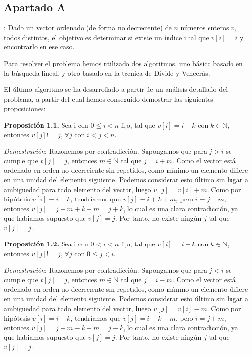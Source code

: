 \usepackage{listings}

\subsection{Apartado A}

: Dado un vector ordenado (de forma no decreciente) de $n$ números enteros $v$, todos 
distintos, el objetivo es determinar si existe un índice i tal que $v[i] = i$ y 
encontrarlo en ese caso. 

Para resolver el problema hemos utilizado dos algoritmos, uno básico basado en 
la búsqueda lineal, y otro basado en la técnica de Divide y Vencerás. 

El último algoritmo se ha desarrollado a partir de un análisis detallado del 
problema, a partir del cual hemos conseguido demostrar las siguientes proposiciones:

\textbf{Proposición 1.1.} Sea i con $0 \leqslant i < n$ fijo, tal que $v[i]=i+k$ con 
$k \in \mathbb N$, entonces $v[j]!=j$, $\forall j$ con $i < j < n$. 

\textit{Demostración}: Razonemos por contradicción. Supongamos que para $j > i$ se 
cumple que $v[j]=j$, entonces \exists $m \in \mathbb N$ tal que $j=i+m$. Como el 
vector está ordenado en orden no decreciente sin repetidos, como mínimo un elemento
difiere en una unidad del elemento siguiente. Podemos considerar esto último sin 
lugar a ambiguedad para todo elemento del vector, luego $v[j]=v[i]+m$. Como por hipótesis
$v[i]=i+k$, tendríamos que $v[j]=i+k+m$, pero $i=j-m$, entonces $v[j]=j-m+k+m=j+k$, lo
cual es una clara contradicción, ya que habiamos supuesto que $v[j]=j$. Por tanto, no 
existe ningún $j$ tal que $v[j]=j$.

\textbf{Proposición 1.2.} Sea i con $0 < i < n$ fijo, tal que $v[i]=i-k$ con 
$k \in \mathbb N$, entonces $v[j]!=j$,  $\forall j$ con $0 \leqslant j < i$. 

\textit{Demostración}: Razonemos por contradicción. Supongamos que para $j < i$ se 
cumple que $v[j]=j$, entonces \exists $m \in \mathbb N$ tal que $j=i-m$. Como el 
vector está ordenado en orden no decreciente sin repetidos, como mínimo un elemento
difiere en una unidad del elemento siguiente. Podemos considerar esto último sin 
lugar a ambiguedad para todo elemento del vector, luego $v[j]=v[i]-m$. Como por hipótesis
$v[i]=i-k$, tendríamos que $v[j]=i-k-m$, pero $i=j+m$, entonces $v[j]=j+m-k-m=j-k$, lo
cual es una clara contradicción, ya que habiamos supuesto que $v[j]=j$. Por tanto, no 
existe ningún $j$ tal que $v[j]=j$.


